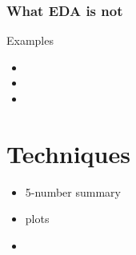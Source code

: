 \documentclass{beamer}
\begin{document}
\begin{frame}
\frametitle{What EDA is not}

Examples 
\begin{itemize}
\item 
\item 
\item 
\end{itemize}

\end{frame}


\section{Techniques}
\begin{frame}

\begin{itemize}
\item 5-number summary
\item plots
\item 
\end{itemize}

\end{frame}


\end{document}

